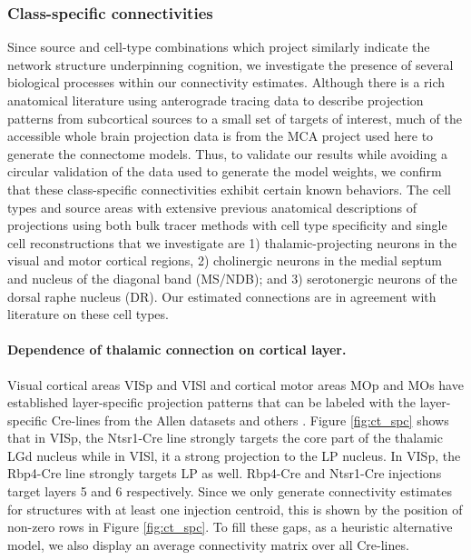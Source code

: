 \newpage
\subsubsection{Class-specific connectivities}
\label{sec:class-specific-connectivities}
Since source and cell-type combinations which project similarly indicate the network structure underpinning cognition, we investigate the presence of several biological processes within our connectivity estimates.
Although there is a rich anatomical literature using anterograde tracing data to describe projection patterns from subcortical sources to a small set of targets of interest, much of the accessible whole brain projection data is from the MCA project used here to generate the connectome models.
Thus, to validate our results while avoiding a circular validation of the data used to generate the model weights, we confirm that these class-specific connectivities exhibit certain known behaviors.
The cell types and source areas with extensive previous anatomical descriptions of projections using both bulk tracer methods with cell type specificity and single cell reconstructions that we investigate are 1) thalamic-projecting neurons in the visual and motor cortical regions, 2) cholinergic neurons in the medial septum and nucleus of the diagonal band (MS/NDB);
and 3) serotonergic neurons of the dorsal raphe nucleus (DR).
Our estimated connections are in agreement with literature on these cell types.

\paragraph{Dependence of thalamic connection on cortical layer.}

Visual cortical areas VISp and VISl and cortical motor areas MOp and MOs have established layer-specific projection patterns that can be labeled with the layer-specific Cre-lines from the Allen datasets and others \citet{Jeong2016-dc, Harris2019-mr}.
Figure \ref{fig:ct_spc} shows that in VISp, the Ntsr1-Cre line strongly targets the core part of the thalamic LGd nucleus while in VISl, it a strong projection to the LP nucleus.
In VISp, the Rbp4-Cre line strongly targets LP as well.  
Rbp4-Cre and Ntsr1-Cre injections target layers 5 and 6 respectively.
Since we only generate connectivity estimates for structures with at least one injection centroid, this is shown by the position of non-zero rows in Figure \ref{fig:ct_spc}.
To fill these gaps, as a heuristic alternative model, we also display an average connectivity matrix over all Cre-lines.

